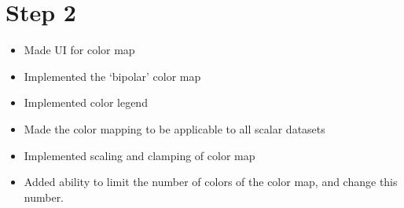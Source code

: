 \section*{Step 2}
\begin{itemize}
	\item Made UI for color map
	\item Implemented the `bipolar' color map
	\item Implemented color legend
	\item Made the color mapping to be applicable to all scalar datasets
	\item Implemented scaling and clamping of color map
	\item Added ability to limit the number of colors of the color map, and change this number.
\end{itemize}